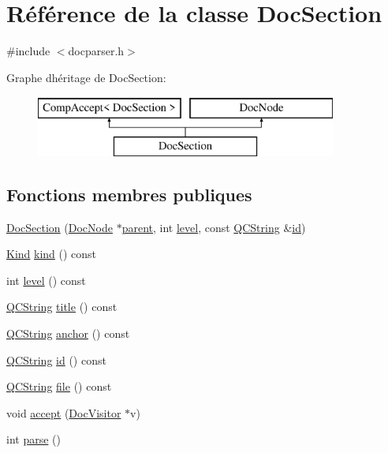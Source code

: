 \hypertarget{class_doc_section}{}\section{Référence de la classe Doc\+Section}
\label{class_doc_section}


{\ttfamily \#include $<$docparser.\+h$>$}

Graphe d\textquotesingle{}héritage de Doc\+Section\+:\begin{figure}[H]
\begin{center}
\leavevmode
\includegraphics[height=2.000000cm]{class_doc_section}
\end{center}
\end{figure}
\subsection*{Fonctions membres publiques}
\begin{DoxyCompactItemize}
\item 
\hyperlink{class_doc_section_aba57080652e8febfe7bb550438d59df7}{Doc\+Section} (\hyperlink{class_doc_node}{Doc\+Node} $\ast$\hyperlink{class_doc_node_a990d8b983962776a647e6231d38bd329}{parent}, int \hyperlink{class_doc_section_a8dc6eaf3ab872e02f71570a7df0571b4}{level}, const \hyperlink{class_q_c_string}{Q\+C\+String} \&\hyperlink{class_doc_section_ade8a1e9d2414fa80e0549a9ca8d46121}{id})
\item 
\hyperlink{class_doc_node_aebd16e89ca590d84cbd40543ea5faadb}{Kind} \hyperlink{class_doc_section_a0a88929cb01b6ce40417cffccc62baae}{kind} () const 
\item 
int \hyperlink{class_doc_section_a8dc6eaf3ab872e02f71570a7df0571b4}{level} () const 
\item 
\hyperlink{class_q_c_string}{Q\+C\+String} \hyperlink{class_doc_section_a04decc0584018ae55d8ac9262d9b105f}{title} () const 
\item 
\hyperlink{class_q_c_string}{Q\+C\+String} \hyperlink{class_doc_section_a995432e6366efd49d70ac381e04ad264}{anchor} () const 
\item 
\hyperlink{class_q_c_string}{Q\+C\+String} \hyperlink{class_doc_section_ade8a1e9d2414fa80e0549a9ca8d46121}{id} () const 
\item 
\hyperlink{class_q_c_string}{Q\+C\+String} \hyperlink{class_doc_section_a2041de375eb77b572e00470f97355e85}{file} () const 
\item 
void \hyperlink{class_doc_section_a18117f5ac173ad791c25cd0620703909}{accept} (\hyperlink{class_doc_visitor}{Doc\+Visitor} $\ast$v)
\item 
int \hyperlink{class_doc_section_a7c92ebabb4381f1bd83cd5f1db4ebc15}{parse} ()
\end{DoxyCompactItemize}
